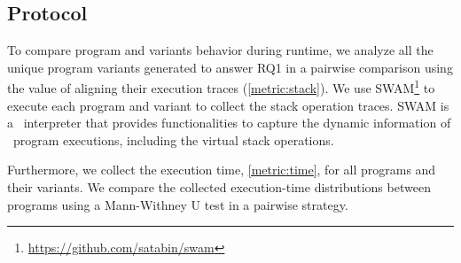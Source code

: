 
\subsection*{Protocol}

To compare program and variants behavior during runtime, we analyze all the unique program variants generated to answer RQ1 in a pairwise comparison using the value of aligning their execution traces (\autoref{metric:stack}). We use SWAM\footnote{\url{https://github.com/satabin/swam}} to execute each program and variant to collect the stack operation traces. SWAM is a \wasm\ interpreter that provides functionalities to capture the dynamic information of \wasm\ program executions, including the virtual stack operations.

Furthermore, we collect the execution time, \autoref{metric:time}, for all programs and their variants. We compare the collected execution-time distributions between programs using a Mann-Withney U test \cite{mann1947} in a pairwise strategy.


 